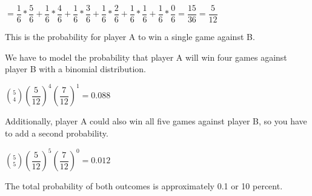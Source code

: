 \documentclass[12pt,letter]{article}\usepackage[]{graphicx}\usepackage[]{color}
\begin{document}
\bigskip

$= \dfrac{1}{6}*\dfrac{5}{6}+\dfrac{1}{6}*\dfrac{4}{6}+\dfrac{1}{6}*\dfrac{3}{6}+\dfrac{1}{6}*\dfrac{2}{6}+\dfrac{1}{6}*\dfrac{1}{6}+\dfrac{1}{6}*\dfrac{0}{6} = \dfrac{15}{36} = \dfrac{5}{12}$

This is the probability for player A to win a single game against B.

\bigskip

We have to model the probability that player A will win four games against player B with a binomial distribution.

$\binom{5}{4}(\dfrac{5}{12})^4(\dfrac{7}{12})^1 = 0.088 $

Additionally, player A could also win all five games against player B, so you have to add a second probability.

$\binom{5}{5}(\dfrac{5}{12})^5(\dfrac{7}{12})^0 = 0.012 $

\bigskip

The total probability of both outcomes is approximately 0.1 or 10 percent.
\end{document}
